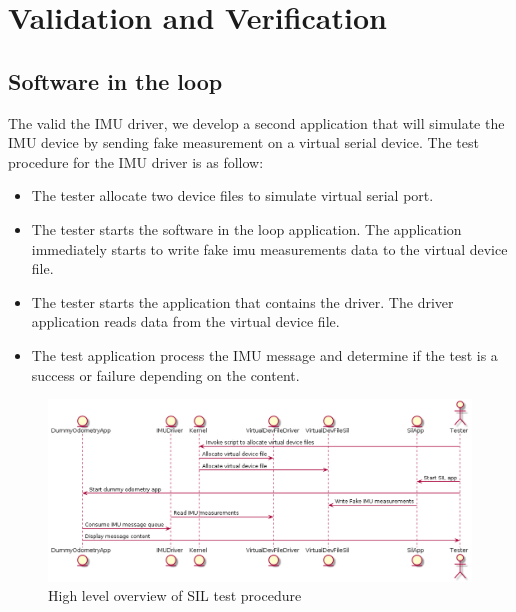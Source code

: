 \section{Validation and Verification}
\subsection{Software in the loop}
The valid the IMU driver, we develop a second application that will simulate the IMU device by sending fake measurement on a virtual serial device.
The test procedure for the IMU driver is as follow:
\begin{itemize}
    \item The tester allocate two device files to simulate virtual serial port.
    \item The tester starts the software in the loop application. The application immediately starts to write fake imu measurements data to the virtual device file.
    \item The tester starts the application that contains the driver. The driver application reads data from the virtual device file.
    \item The test application process the IMU message and determine if the test is a success or failure depending on the content.
\end{itemize}



\begin{figure}[ht]
    \centering
    \includegraphics[width=0.75 \textwidth]{diagrams/software_in_the_loop.png}
    \caption{High level overview of SIL test procedure}
    \label{reference}
\end{figure}
